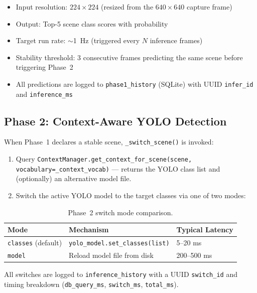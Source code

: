 \documentclass[12pt,a4paper]{article}
\begin{document}
\begin{itemize}[leftmargin=*]
  \item Input resolution: $224 \times 224$ (resized from the $640 \times 640$
        capture frame)
  \item Output: Top-5 scene class scores with probability
  \item Target run rate: $\sim$1~Hz (triggered every $N$ inference frames)
  \item Stability threshold: 3 consecutive frames predicting the same scene
        before triggering Phase~2
  \item All predictions are logged to \texttt{phase1\_history} (SQLite) with
        UUID \texttt{infer\_id} and \texttt{inference\_ms}
\end{itemize}

\subsection{Phase 2: Context-Aware YOLO Detection}

When Phase~1 declares a stable scene, \texttt{\_switch\_scene()} is invoked:

\begin{enumerate}[leftmargin=*]
  \item Query \texttt{ContextManager.get\_context\_for\_scene(scene,
        vocabulary=\_context\_vocab)} — returns the YOLO class list and
        (optionally) an alternative model file.
  \item Switch the active YOLO model to the target classes via one of two modes:
\end{enumerate}

\begin{table}[H]
\centering
\caption{Phase~2 switch mode comparison.}
\label{tab:phase2_modes}
\begin{tabular}{@{}lll@{}}
\toprule
\textbf{Mode}   & \textbf{Mechanism}               & \textbf{Typical Latency} \\
\midrule
\texttt{classes} (default) & \texttt{yolo\_model.set\_classes(list)} & 5–20 ms \\
\texttt{model}             & Reload model file from disk            & 200–500 ms \\
\bottomrule
\end{tabular}
\end{table}

All switches are logged to \texttt{inference\_history} with a UUID
\texttt{switch\_id} and timing breakdown (\texttt{db\_query\_ms},
\texttt{switch\_ms}, \texttt{total\_ms}).
\end{document}
